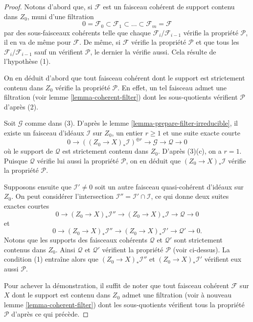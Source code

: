 \begin{proof}
Notons d'abord que, si $\mathcal{F}$ est un faisceau cohérent de support
contenu dans $Z_0$, muni d'une filtration
$$
0 = \mathcal{F}_0 \subset \mathcal{F}_1 \subset
\ldots \subset \mathcal{F}_m = \mathcal{F}
$$
par des sous-faisceaux cohérents telle que chaque $\mathcal{F}_i/\mathcal{F}_{i - 1}$
vérifie la propriété $\mathcal{P}$, il en va de même pour $\mathcal{F}$. De même, si $\mathcal{F}$
vérifie la propriété $\mathcal{P}$ et que tous les
$\mathcal{F}_i/\mathcal{F}_{i - 1}$ sauf un vérifient $\mathcal{P}$,
le dernier la vérifie aussi. Cela résulte de l'hypothèse (1).

\medskip\noindent
On en déduit d'abord que tout faisceau cohérent dont le support
est strictement contenu dans $Z_0$ vérifie la propriété $\mathcal{P}$. En effet, un
tel faisceau admet une filtration (voir lemme \ref{lemma-coherent-filter})
dont les sous-quotients vérifient $\mathcal{P}$ d'après (2).

\medskip\noindent
Soit $\mathcal{G}$ comme dans (3). D'après le lemme \ref{lemma-prepare-filter-irreducible},
il existe un faisceau d'idéaux $\mathcal{I}$ sur $Z_0$, un
entier $r \geq 1$ et une suite exacte courte
$$
0 \to
\left((Z_0 \to X)_*\mathcal{I}\right)^{\oplus r} \to
\mathcal{G} \to
\mathcal{Q} \to 0
$$
où le support de $\mathcal{Q}$ est strictement contenu dans $Z_0$.
D'après (3)(c), on a $r = 1$. Puisque $\mathcal{Q}$ vérifie lui aussi la propriété $\mathcal{P}$,
on en déduit que $(Z_0 \to X)_*\mathcal{I}$ vérifie la propriété
$\mathcal{P}$.

\medskip\noindent
Supposons ensuite que $\mathcal{I}' \not = 0$ soit un autre
faisceau quasi-cohérent d'idéaux sur $Z_0$. On peut considérer l'intersection
$\mathcal{I}'' = \mathcal{I}' \cap \mathcal{I}$, ce qui
donne deux suites exactes courtes
$$
0 \to
(Z_0 \to X)_*\mathcal{I}'' \to
(Z_0 \to X)_*\mathcal{I} \to
\mathcal{Q} \to 0
$$
et
$$
0 \to
(Z_0 \to X)_*\mathcal{I}'' \to
(Z_0 \to X)_*\mathcal{I}' \to
\mathcal{Q}' \to 0.
$$
Notons que les supports des faisceaux cohérents $\mathcal{Q}$ et
$\mathcal{Q}'$ sont strictement contenus dans $Z_0$.
Ainsi $\mathcal{Q}$ et $\mathcal{Q}'$ vérifient la propriété $\mathcal{P}$
(voir ci-dessus). La condition (1) entraîne alors
que $(Z_0 \to X)_*\mathcal{I}''$ et $(Z_0 \to X)_*\mathcal{I}'$
vérifient eux aussi $\mathcal{P}$.

\medskip\noindent
Pour achever la démonstration, il suffit de noter que tout faisceau cohérent
$\mathcal{F}$ sur $X$ dont le support est contenu dans $Z_0$ admet une filtration (voir
à nouveau lemme \ref{lemma-coherent-filter}) dont les sous-quotients
vérifient tous la propriété $\mathcal{P}$ d'après ce qui précède.
\end{proof}

